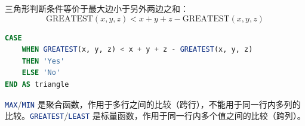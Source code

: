 \begin{homework}[610 | 高级查询和连接 第3题]
\begin{note}
三角形判断条件等价于最大边小于另外两边之和：
\[
\text{GREATEST}(x,y,z) < x+y+z - \text{GREATEST}(x,y,z)
\]
\begin{lstlisting}[language=SQL, backgroundcolor=\color{white}, frame=single]
CASE
    WHEN GREATEST(x, y, z) < x + y + z - GREATEST(x, y, z)
    THEN 'Yes'
    ELSE 'No'
END AS triangle
\end{lstlisting}
\end{note}
\begin{note}
\lstinline[language=SQL]|MAX|/\lstinline[language=SQL]|MIN| 是聚合函数，作用于多行之间的比较（跨行），不能用于同一行内多列的比较。\lstinline[language=SQL]|GREATEST|/\lstinline[language=SQL]|LEAST| 是标量函数，作用于同一行内多个值之间的比较（跨列）。
\end{note}
\end{homework}

